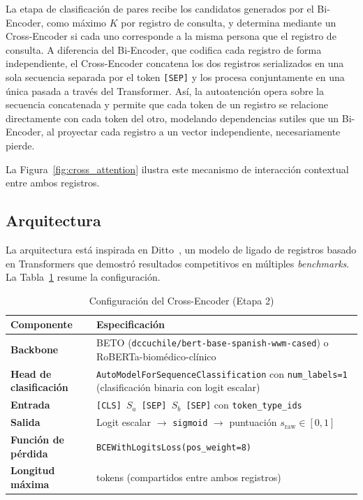 La etapa de clasificación de pares recibe los candidatos generados por el Bi-Encoder, como máximo $K$ por registro de consulta, y determina mediante un Cross-Encoder si cada uno corresponde a la misma persona que el registro de consulta. A diferencia del Bi-Encoder, que codifica cada registro de forma independiente, el Cross-Encoder concatena los dos registros serializados en una sola secuencia separada por el token \texttt{[SEP]} y los procesa conjuntamente en una única pasada a través del Transformer. Así, la autoatención opera sobre la secuencia concatenada y permite que cada token de un registro se relacione directamente con cada token del otro, modelando dependencias sutiles que un Bi-Encoder, al proyectar cada registro a un vector independiente, necesariamente pierde.

La Figura~\ref{fig:cross_attention} ilustra este mecanismo de interacción contextual entre ambos registros.



\subsection{Arquitectura}

La arquitectura está inspirada en Ditto~\cite{li2020}, un modelo de ligado de registros basado en Transformers que demostró resultados competitivos en múltiples \textit{benchmarks}. La Tabla~\ref{tab:cross_encoder_architecture} resume la configuración.

\begin{table}[H]
\centering
\caption{Configuración del Cross-Encoder (Etapa 2)}
\label{tab:cross_encoder_architecture}
\small
\begin{tabular}{>{\raggedright\arraybackslash}p{4.5cm} >{\raggedright\arraybackslash}p{10cm}}
\toprule
\textbf{Componente} & \textbf{Especificación} \\
\midrule
\textbf{Backbone} & BETO (\texttt{dccuchile/bert-base-spanish-wwm-cased}) o RoBERTa-biomédico-clínico \\
\textbf{Head de clasificación} & \texttt{AutoModelForSequenceClassification} con \texttt{num\_labels=1} (clasificación binaria con logit escalar) \\
\textbf{Entrada} & \texttt{[CLS] $S_a$ [SEP] $S_b$ [SEP]} con \texttt{token\_type\_ids} \\
\textbf{Salida} & Logit escalar $\to$ \texttt{sigmoid} $\to$ puntuación $s_{\mathrm{raw}} \in [0,1]$ \\
\textbf{Función de pérdida} & \texttt{BCEWithLogitsLoss(pos\_weight=8)} \\
\textbf{Longitud máxima} & 512 tokens (compartidos entre ambos registros) \\
\bottomrule
\end{tabular}
\end{table}

